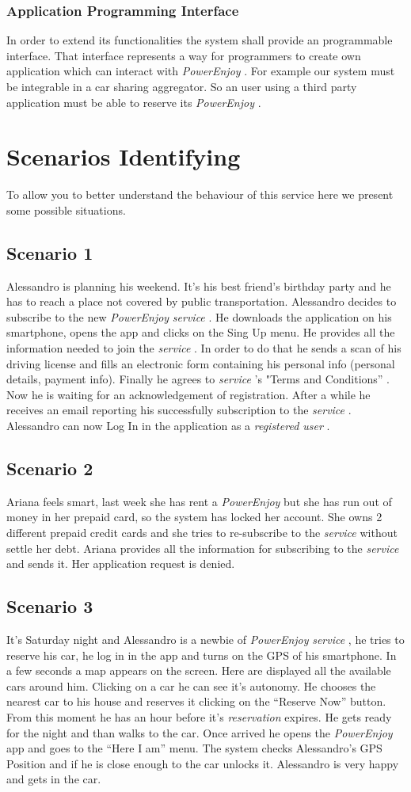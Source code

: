 \documentclass[english]{article}
\newcommand{\powerenjoy}{\textit{PowerEnjoy }}
\newcommand{\registereduser}{\textit {registered user }}
\newcommand{\service}{\textit{service }}
\newcommand{\reservation}{\textit{reservation }}
\begin{document}
		\subsubsection{Application Programming Interface}
		In order to extend its functionalities the system shall provide an programmable interface. That interface represents a way for programmers to create own application which can interact with \powerenjoy. For example our system must be integrable in a car sharing aggregator. So an user using a third party application must be able to reserve its \powerenjoy.
		

\section{Scenarios Identifying}
	To allow you to better understand the behaviour of this service here we present some possible situations.
	\subsection{Scenario 1}
		Alessandro is planning his weekend. It's his best friend's birthday party and he has to reach a place not covered by public transportation. Alessandro decides to subscribe to the new \powerenjoy \service. He downloads the application on his smartphone, opens the app and clicks on the Sing Up menu. He provides all the information needed to join the \service. In order to do that he sends a scan of his driving license and fills an electronic form containing his personal info (personal details, payment info). Finally he agrees to \service's	"Terms and Conditions'' .
		Now he is waiting for an acknowledgement of registration. After a while he receives an email reporting his successfully subscription to the \service. Alessandro can now Log In in the application as a \registereduser.
	\subsection{Scenario 2}
		Ariana feels smart, last week she has rent a \powerenjoy but she has run out of money in her prepaid card, so the system has locked her account. She owns 2 different prepaid credit cards and she tries to re-subscribe to the \service without settle her debt. Ariana provides all the information for subscribing to the \service and sends it. Her application request is denied.
	\subsection{Scenario 3}
		It's Saturday night and Alessandro is a newbie of \powerenjoy \service, he tries to reserve his car, he log in in the app and turns on the GPS of his smartphone. In a few seconds a map appears on the screen. Here are displayed all the available cars around him. Clicking on a car he can see it's autonomy. He chooses the nearest car to his house and reserves it clicking on the ``Reserve Now'' button. From this moment he has an hour before it's \reservation expires. He gets ready for the night and than walks to the car. Once arrived he opens the 	\powerenjoy app and goes to the ``Here I am'' menu. The system checks Alessandro's GPS Position and if he is close enough to the car unlocks it. Alessandro is very happy and gets in the car.
\end{document}
